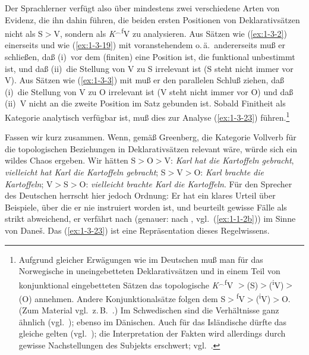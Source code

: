 \documentclass[output=paper]{langsci/langscibook}
\begin{document}
Der Sprachlerner verfügt also über mindestens zwei verschiedene Arten
von Evidenz, die ihn dahin führen, die beiden ersten Positionen von
Deklarativsätzen nicht als S$>$V, sondern als \textit{K}$^{\smallfrown}$\textsuperscript{f}V zu analysieren. Aus Sätzen wie (\ref{ex:1-3-2})
einerseits und wie (\ref{ex:1-3-19}) mit voranstehendem 
o.\,ä.\ andererseits muß er schließen, daß (i)~vor dem (finiten) 
eine Position ist, die funktional unbestimmt ist, und daß (ii)~die
Stellung von V zu S irrelevant ist (S steht nicht immer vor V). Aus
Sätzen wie (\ref{ex:1-3-3}) mit  muß er den parallelen Schluß
ziehen, daß (i)~die Stellung von V zu O irrelevant ist (V steht nicht
immer vor O) und daß (ii)~V nicht an die zweite Position im Satz
gebunden ist. Sobald Finitheit als Kategorie analytisch verfügbar ist,
muß dies zur Analyse (\ref{ex:1-3-23}) führen.\footnote{%
  Aufgrund
  gleicher Erwägungen wie im Deutschen muß man für das Norwegische in
  uneingebetteten Deklarativsätzen und in einem Teil von konjunktional
  eingebetteten Sätzen das topologische  \textit{K}$^{\smallfrown}$\textsuperscript{f}V $>$(S)$>$(\textsuperscript{i}V)$>$(O)
  annehmen. Andere Konjunktionalsätze folgen dem 
  S$>$\textsuperscript{f}V$>$(\textsuperscript{i}V)$>$O.  (Zum
  Material vgl.\ z.\,B.\ \citet{Faarlund1981}.) Im Schwedischen sind
  die Verhältnisse ganz ähnlich (vgl.\ \citealt{Andersson1975}); ebenso
  im Dänischen. Auch für das Isländische dürfte das gleiche 
  gelten (vgl.\ \citealt{MalingZaenen1978,MalingZaenen1981}); die
  Interpretation der Fakten wird allerdings durch gewisse
  Nachstellungen des Subjekts erschwert; vgl.\ \citet{Maling1980}.\label{fn:16}%
}

\ssubsubsection{}%
\label{subsubsec:1-3.2.3}

Fassen wir kurz zusammen. Wenn, gemäß Greenberg, die Kategorie Vollverb
für die topologischen Beziehungen in Deklarativsätzen relevant wäre, würde sich ein
wildes Chaos ergeben. Wir hätten S$>$O$>$V: \textit{Karl hat die Kartoffeln gebracht}, \textit{vielleicht hat Karl die Kartoffeln gebracht}; S$>$V$>$O: \textit{Karl brachte die Kartoffeln}; V$>$S$>$O: \textit{vielleicht brachte Karl die Kartoffeln}. Für den Sprecher des Deutschen herrscht hier jedoch Ordnung: Er hat ein klares Urteil über Beispiele, über die er nie
instruiert worden ist, und beurteilt gewisse Fälle als strikt abweichend, \dash er verfährt nach  (genauer: nach , vgl.\ (\ref{ex:1-1-2b})) im Sinne
von Dane\v{s}. Das  (\ref{ex:1-3-23}) ist eine Repräsentation dieses Regelwissens.
\end{document}
